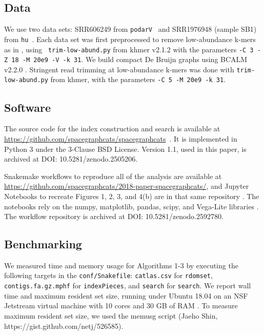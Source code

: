 \subsection*{Data}

We use two data sets: SRR606249 from
\texttt{podarV}~\cite{shakya2013comparative} and SRR1976948 (sample
SB1) from \texttt{hu}~\cite{hu}. Each data set was first preprocessed
to remove low-abundance k-mers as in \cite{Zhang2015}, using {\tt
  trim-low-abund.py} from khmer v2.1.2 \cite{Standage2017} with the
parameters {\tt -C 3 -Z 18 -M 20e9 -V -k 31}. We build compact De Bruijn
graphs using BCALM v2.2.0 \cite{bcalm}.  Stringent read trimming at
low-abundance k-mers was done with {\tt trim-low-abund.py} from khmer, with the
parameters {\tt -C 5 -M 20e9 -k 31}.

\subsection*{Software}

The source code for the index construction and search is available at
\url{https://github.com/spacegraphcats/spacegraphcats}~\cite{spacegraphcats}.
It is implemented in Python 3 under the 3-Clause BSD License. Version 1.1, used in this paper, is archived at DOI: 10.5281/zenodo.2505206.

Snakemake \cite{snakemake} workflows to reproduce all of the analysis
are available at
\url{https://github.com/spacegraphcats/2018-paper-spacegraphcats/},
and Jupyter Notebooks to recreate Figures 1, 2, 3, and 4(b) are in
that same repository \cite{jupyter}. The notebooks rely on the numpy,
matplotlib, pandas, scipy, and Vega-Lite libraries
\cite{numpy,matplotlib,pandas,scipy,vegalite}. The workflow repository
is archived at DOI: 10.5281/zenodo.2592780.

\subsection*{Benchmarking}

We measured time and memory usage for Algorithms 1-3 by executing the
following targets in the \sgc \texttt{conf/Snakefile}:
\texttt{catlas.csv} for \texttt{rdomset}, \texttt{contigs.fa.gz.mphf}
for \texttt{indexPieces}, and \texttt{search} for \texttt{search}.  We
report wall time and maximum resident set size, running under Ubuntu
18.04 on an NSF Jetstream virtual machine with 10 cores and 30 GB of
RAM \cite{jetstream1,jetstream2}. To measure maximum resident set
size, we used the memusg script (Jaeho Shin,
https://gist.github.com/netj/526585).

